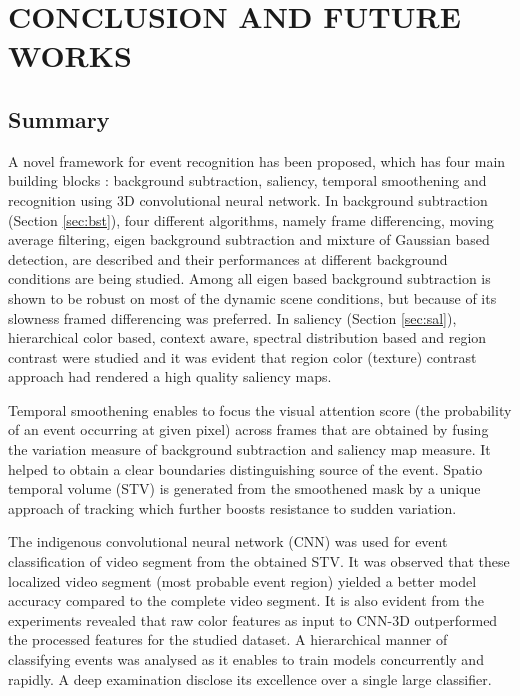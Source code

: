 \chapter{CONCLUSION AND FUTURE WORKS}
\label{chap:concl}

\section{Summary}
A novel framework for event recognition has been proposed, which has four main building blocks : background subtraction, saliency, temporal smoothening and recognition using 3D convolutional neural network.  In background subtraction (Section \ref{sec:bst}), four different algorithms, namely frame differencing, moving average filtering, eigen background subtraction and mixture of Gaussian based detection, are described and their performances at different background conditions are being studied.  Among all eigen based background subtraction is shown to be robust on most of the dynamic scene conditions, but because of its slowness framed differencing was preferred.  In saliency (Section \ref{sec:sal}), hierarchical color based, context aware, spectral distribution based and region contrast were studied and it was evident that region color (texture) contrast approach had rendered a high quality saliency maps.

\par Temporal smoothening enables to focus the visual attention score (the probability of an event occurring at given pixel) across frames that are obtained by fusing the variation measure of background subtraction and saliency map measure.  It helped to obtain a clear boundaries distinguishing source of the event.  Spatio temporal volume (STV) is generated from the smoothened mask by a unique approach of tracking which further boosts resistance to sudden variation.

\par The indigenous convolutional neural network (CNN) was used for event classification of video segment from the  obtained STV.  It was observed that these localized video segment (most probable event region) yielded a better model accuracy compared to the complete video segment.  It is also evident from the experiments revealed that raw color features as input to CNN-3D outperformed the processed features for the studied dataset.  A hierarchical manner of classifying events was analysed as it enables to train models concurrently and rapidly.  A deep examination disclose its excellence over a single large classifier.

